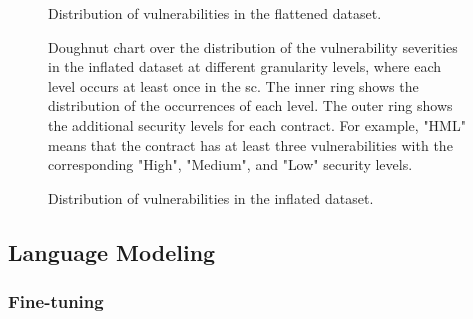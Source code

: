 \begin{figure}[htbp]
    \centering
    
    \caption{Distribution of vulnerabilities in the flattened dataset.}
\end{figure}



\begin{figure}[htbp]
    \centering
    
    \caption{Doughnut chart over the distribution of the vulnerability severities in the inflated dataset at different granularity levels, where each level occurs at least once in the \acrshort{sc}. The inner ring shows the distribution of the occurrences of each level. The outer ring shows the additional security levels for each contract. For example, "HML" means that the contract has at least three vulnerabilities with the corresponding "High", "Medium", and "Low" security levels.}
\end{figure}


\begin{figure}[htbp]
    \centering
    
    \caption{Distribution of vulnerabilities in the inflated dataset.}
\end{figure}

\subsection{Language Modeling}
\label{sec:language-modeling}

\subsubsection{Fine-tuning}
\label{sec:fine-tuning}